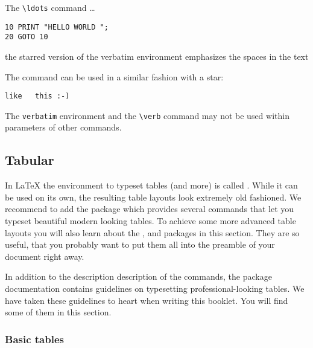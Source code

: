 \begin{example}
The \verb|\ldots| command \ldots

\begin{verbatim}
10 PRINT "HELLO WORLD ";
20 GOTO 10
\end{verbatim}
\end{example}

\begin{example}
\begin{verbatim*}
the starred version of
the      verbatim
environment emphasizes
the spaces   in the text
\end{verbatim*}
\end{example}

The  command can be used in a similar fashion with a star:

\begin{example}
\verb*|like   this :-) |
\end{example}

The \texttt{verbatim} environment and the \verb|\verb| command may not be used
within parameters of other commands.


\subsection{Tabular}

In \LaTeX{} the environment to typeset tables (and more) is called
. While it can be used on its own, the resulting table layouts look
extremely old fashioned. We recommend to add the  package which
provides several commands that let you typeset beautiful modern looking tables.
To achieve some more advanced table layouts you will also learn about the
,  and  packages in this section.
They are so useful, that you probably want to put them all into the preamble of
your document right away.

In addition to the description description of the commands, the 
package documentation \cite{pack:booktabs} contains guidelines on typesetting
professional-looking tables. We have taken these guidelines to heart when
writing this booklet. You will find some of them in this section.

\subsubsection{Basic tables} \label{foo}

